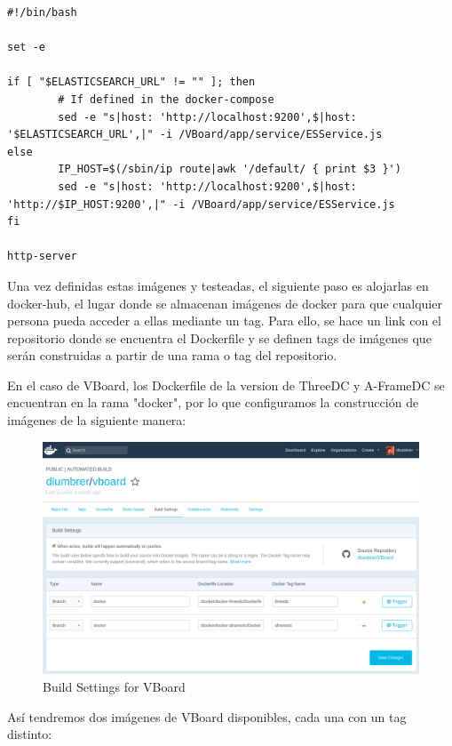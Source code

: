\documentclass[a4paper, 12pt]{book}
\begin{document}
\begin{lstlisting}[frame=single]
#!/bin/bash

set -e

if [ "$ELASTICSEARCH_URL" != "" ]; then
        # If defined in the docker-compose
        sed -e "s|host: 'http://localhost:9200',$|host: '$ELASTICSEARCH_URL',|" -i /VBoard/app/service/ESService.js
else
        IP_HOST=$(/sbin/ip route|awk '/default/ { print $3 }')
        sed -e "s|host: 'http://localhost:9200',$|host: 'http://$IP_HOST:9200',|" -i /VBoard/app/service/ESService.js
fi

http-server
\end{lstlisting}

Una vez definidas estas imágenes y testeadas, el siguiente paso es alojarlas en docker-hub, el lugar donde se almacenan imágenes de docker para que cualquier persona pueda acceder a ellas mediante un tag. Para ello, se hace un link con el repositorio donde se encuentra el Dockerfile y se definen tags de imágenes que serán construidas a partir de una rama o tag del repositorio.

En el caso de VBoard, los Dockerfile de la version de ThreeDC y A-FrameDC se encuentran en la rama "docker", por lo que configuramos la construcción de imágenes de la siguiente manera:

\begin{figure}[H]
  \centering
  \includegraphics[width=16cm, keepaspectratio]{img/development/docker-hub-0}
  \caption{Build Settings for VBoard}
  \label{fig:examplestandalone}
\end{figure}

Así tendremos dos imágenes de VBoard disponibles, cada una con un tag distinto:
\end{document}
